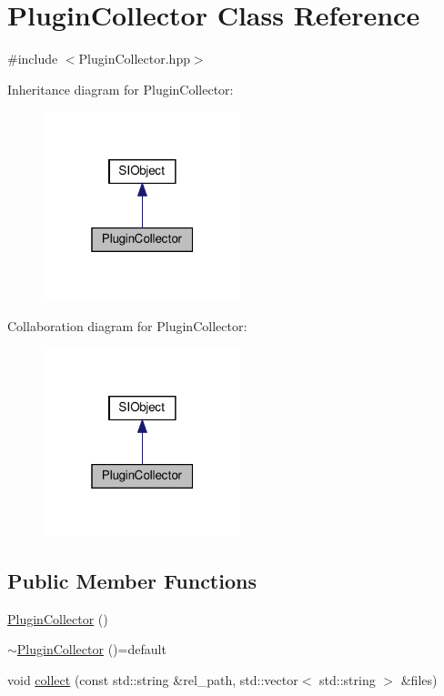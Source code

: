 \hypertarget{class_plugin_collector}{}\section{Plugin\+Collector Class Reference}
\label{class_plugin_collector}


{\ttfamily \#include $<$Plugin\+Collector.\+hpp$>$}



Inheritance diagram for Plugin\+Collector\+:\nopagebreak
\begin{figure}[H]
\begin{center}
\leavevmode
\includegraphics[width=163pt]{class_plugin_collector__inherit__graph}
\end{center}
\end{figure}


Collaboration diagram for Plugin\+Collector\+:\nopagebreak
\begin{figure}[H]
\begin{center}
\leavevmode
\includegraphics[width=163pt]{class_plugin_collector__coll__graph}
\end{center}
\end{figure}
\subsection*{Public Member Functions}
\begin{DoxyCompactItemize}
\item 
\mbox{\hyperlink{class_plugin_collector_a53aeef5e9d4d5c31903532f879b205d1}{Plugin\+Collector}} ()
\item 
\mbox{\hyperlink{class_plugin_collector_a3f4b864ec982e40a674a6e6719fe203b}{$\sim$\+Plugin\+Collector}} ()=default
\item 
void \mbox{\hyperlink{class_plugin_collector_ae96e3b7e48388cf5acddfc8ca750394e}{collect}} (const std\+::string \&rel\+\_\+path, std\+::vector$<$ std\+::string $>$ \&files)
\end{DoxyCompactItemize}

